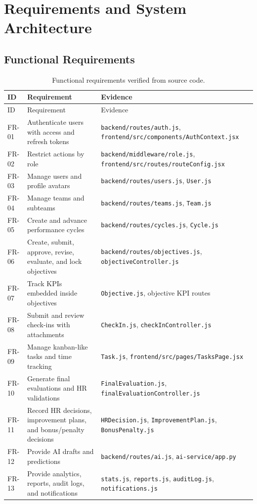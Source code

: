 \chapter{Requirements and System Architecture}
\section{Functional Requirements}
\begin{longtable}{p{}p{}p{}}
\caption{Functional requirements verified from source code.}\label{tab:functional-requirements}\\
\toprule
ID & Requirement & Evidence\\
\midrule
\endfirsthead
\toprule
ID & Requirement & Evidence\\
\midrule
\endhead
FR-01 & Authenticate users with access and refresh tokens & \texttt{backend/routes/auth.js}, \texttt{frontend/src/components/AuthContext.jsx}\\
FR-02 & Restrict actions by role & \texttt{backend/middleware/role.js}, \texttt{frontend/src/routes/routeConfig.jsx}\\
FR-03 & Manage users and profile avatars & \texttt{backend/routes/users.js}, \texttt{User.js}\\
FR-04 & Manage teams and subteams & \texttt{backend/routes/teams.js}, \texttt{Team.js}\\
FR-05 & Create and advance performance cycles & \texttt{backend/routes/cycles.js}, \texttt{Cycle.js}\\
FR-06 & Create, submit, approve, revise, evaluate, and lock objectives & \texttt{backend/routes/objectives.js}, \texttt{objectiveController.js}\\
FR-07 & Track KPIs embedded inside objectives & \texttt{Objective.js}, objective KPI routes\\
FR-08 & Submit and review check-ins with attachments & \texttt{CheckIn.js}, \texttt{checkInController.js}\\
FR-09 & Manage kanban-like tasks and time tracking & \texttt{Task.js}, \texttt{frontend/src/pages/TasksPage.jsx}\\
FR-10 & Generate final evaluations and HR validations & \texttt{FinalEvaluation.js}, \texttt{finalEvaluationController.js}\\
FR-11 & Record HR decisions, improvement plans, and bonus/penalty decisions & \texttt{HRDecision.js}, \texttt{ImprovementPlan.js}, \texttt{BonusPenalty.js}\\
FR-12 & Provide AI drafts and predictions & \texttt{backend/routes/ai.js}, \texttt{ai-service/app.py}\\
FR-13 & Provide analytics, reports, audit logs, and notifications & \texttt{stats.js}, \texttt{reports.js}, \texttt{auditLog.js}, \texttt{notifications.js}\\
\bottomrule
\end{longtable}


